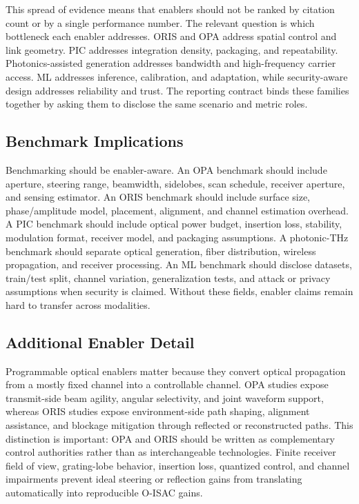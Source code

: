 \documentclass[letterpaper,journal]{IEEEtran}
\begin{document}
This spread of evidence means that enablers should not be ranked by citation count or by a single performance number. The relevant question is which bottleneck each enabler addresses. ORIS and OPA address spatial control and link geometry. PIC addresses integration density, packaging, and repeatability. Photonics-assisted generation addresses bandwidth and high-frequency carrier access. ML addresses inference, calibration, and adaptation, while security-aware design addresses reliability and trust. The reporting contract binds these families together by asking them to disclose the same scenario and metric roles.

\subsection{Benchmark Implications}

Benchmarking should be enabler-aware. An OPA benchmark should include aperture, steering range, beamwidth, sidelobes, scan schedule, receiver aperture, and sensing estimator. An ORIS benchmark should include surface size, phase/amplitude model, placement, alignment, and channel estimation overhead. A PIC benchmark should include optical power budget, insertion loss, stability, modulation format, receiver model, and packaging assumptions. A photonic-THz benchmark should separate optical generation, fiber distribution, wireless propagation, and receiver processing. An ML benchmark should disclose datasets, train/test split, channel variation, generalization tests, and attack or privacy assumptions when security is claimed. Without these fields, enabler claims remain hard to transfer across modalities.

\subsection{Additional Enabler Detail}

Programmable optical enablers matter because they convert optical propagation from a mostly fixed channel into a controllable channel. OPA studies expose transmit-side beam agility, angular selectivity, and joint waveform support, whereas ORIS studies expose environment-side path shaping, alignment assistance, and blockage mitigation through reflected or reconstructed paths. This distinction is important: OPA and ORIS should be written as complementary control authorities rather than as interchangeable technologies. Finite receiver field of view, grating-lobe behavior, insertion loss, quantized control, and channel impairments prevent ideal steering or reflection gains from translating automatically into reproducible O-ISAC gains.
\end{document}
